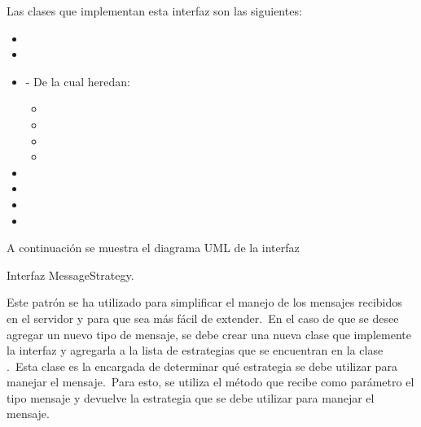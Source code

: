 Las clases que implementan esta interfaz son las siguientes:

\begin{itemize}
	\item {}
	\item {}
	\item {} - De la cual heredan:
	\begin{itemize}
		\item {}
		\item {}
		\item {}
		\item {}
	\end{itemize}
	\item {}
	\item {}
	\item {}
	\item {}
\end{itemize}
\label{itm:strategies}

A continuación se muestra el diagrama UML de la interfaz 

\begin{umlDiagram}
	\centering

	\caption{Interfaz MessageStrategy.}
\end{umlDiagram}

Este patrón se ha utilizado para simplificar el manejo de los mensajes recibidos en el servidor y para que sea más
fácil de extender.\ En el caso de que se desee agregar un nuevo tipo de mensaje, se debe crear una nueva clase que
implemente la interfaz  y agregarla a la lista de estrategias que se encuentran en la
clase .\ Esta clase es la encargada de determinar qué estrategia se debe utilizar para
manejar el mensaje.\ Para esto, se utiliza el método  que
recibe como parámetro el tipo mensaje y devuelve la estrategia que se debe utilizar para manejar el mensaje.
